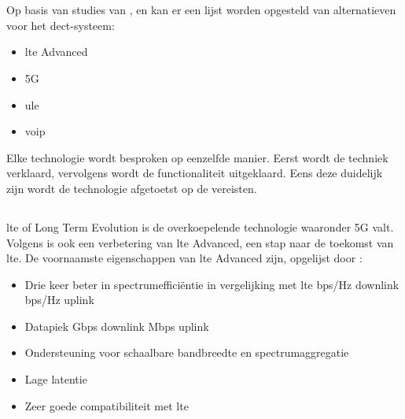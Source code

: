 \section{}%
\label{sec:andere}%

Op basis van studies van \textcite{Montalvo2024}, \textcite{Kranz2010} en \textcite{Soenmez2018} kan er een lijst worden opgesteld van alternatieven voor het \gls{dect}-systeem:

\begin{itemize}
  \item \gls{lte} Advanced
  \item 5G
  \item \gls{ule}
  \item \gls{voip}
\end{itemize}

Elke technologie wordt besproken op eenzelfde manier. Eerst wordt de techniek verklaard, vervolgens wordt de functionaliteit uitgeklaard. Eens deze duidelijk zijn wordt de technologie afgetoetst op de vereisten.

\subsection{}%
\label{sec:ltea}%

\gls{lte} of Long Term Evolution is de overkoepelende technologie waaronder 5G valt. Volgens \textcite{Bakare2022} is ook een verbetering van \gls{lte} Advanced, een stap naar de toekomst van \gls{lte}. De voornaamste eigenschappen van \gls{lte} Advanced zijn, opgelijst door \textcite{Bakare2022}:

\begin{itemize}
  \item Drie keer beter in spectrumefficiëntie in vergelijking met \gls{lte}
   bps/Hz downlink
   bps/Hz uplink
  \item Datapiek 
   Gbps downlink
   Mbps uplink
  \item Ondersteuning voor schaalbare bandbreedte en spectrumaggregatie
  \item Lage latentie
  \item Zeer goede compatibiliteit met \gls{lte}
\end{itemize}

